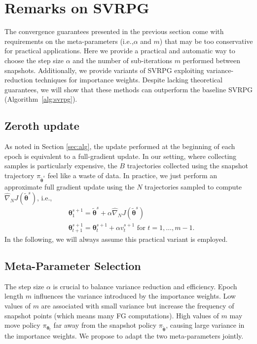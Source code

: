 \documentclass{article}
\makeatletter
\theoremstyle{remark}
\theoremstyle{definition}
\DeclareRobustCommand{\ie}{i.e.,\@\xspace}
\newcommand{\vtheta}{\boldsymbol{\theta}}
\newcommand{\gradApp}[2]{\widehat{\nabla}_{#2}J(#1)}
\newcommand{\wt}[1]{\widetilde{#1}}
\makeatother
\begin{document}
\section{Remarks on SVRPG}
The convergence guarantees presented in the previous section come with requirements on the meta-parameters (\ie $\alpha$ and $m$) that may be too conservative for practical applications.
Here we provide a practical and automatic way to choose the step size $\alpha$ and the number of sub-iterations $m$ performed between snapshots.
Additionally, we provide variants of SVRPG exploiting variance-reduction techniques for importance weights. Despite lacking theoretical guarantees, we will show that these methods can outperform the baseline SVRPG (Algorithm~\ref{alg:svrpg}).

\subsection{Zeroth update}
As noted in Section \ref{sec:alg}, the update performed at the beginning of each epoch is equivalent to a full-gradient update. In our setting, where collecting samples is particularly expensive, the $B$ trajectories collected using the snapshot trajectory $\pi_{\tilde{\vtheta}^s}$ feel like a waste of data. In practice, we just perform an approximate full gradient update using the $N$ trajectories sampled to compute $\gradApp{\tilde{\vtheta}^s}{N}$, \ie
\begin{align*}
	&\vtheta_{1}^{s+1} = \tilde{\vtheta}^s + \alpha\gradApp{\tilde{\vtheta}^s}{N} \\
	&\vtheta_{t+1}^{s+1} = \vtheta_t^{s+1} + \alpha v_t^{s+1} \text{ for $t=1,\dots,m-1$}.
\end{align*}
In the following, we will always assume this practical variant is employed.

\subsection{Meta-Parameter Selection}\label{sec:stopping}
The step size $\alpha$ is crucial to balance variance reduction and efficiency.
Epoch length $m$ influences the variance introduced by the importance weights. Low values of $m$ are associated with small variance but increase the frequency of snapshot points (which means many FG computations). High values of $m$ may move policy $\pi_{\vtheta_t}$ far away from the snapshot policy $\pi_{\wt{\vtheta}}$, causing large variance in the importance weights. We propose to adapt the two meta-parameters jointly.
\end{document}
